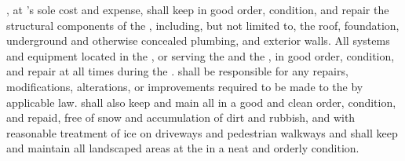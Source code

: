 \lessor, at \lessor's sole cost and expense, shall keep in good order, condition, and repair the structural components of the \building, including, but not limited to, the roof, foundation, underground and otherwise concealed plumbing, and exterior walls. All systems and equipment located in the \building, or serving the \premises and the \commonAreas, in good order, condition, and repair at all times during the \termOfLease. \lessor shall be responsible for any repairs, modifications, alterations, or improvements required to be made to the \building by applicable law. \lessor shall also keep and main all \commonAreas in a good and clean order, condition, and repaid, free of snow and accumulation of dirt and rubbish, and with reasonable treatment of ice on driveways and pedestrian walkways and shall keep and maintain all landscaped areas at the \building in a neat and orderly condition.
